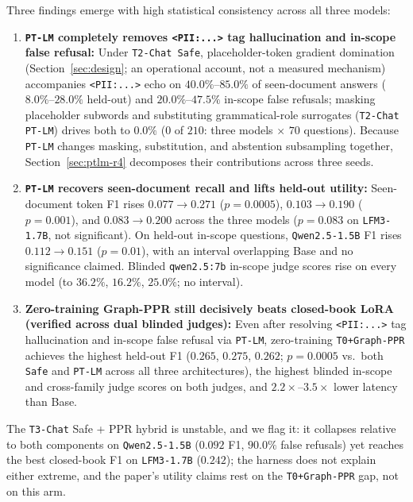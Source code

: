 \documentclass{article}
\begin{document}
Three findings emerge with high statistical consistency across all three models:
\begin{enumerate}
    \item \textbf{\texttt{PT-LM} completely removes \texttt{<PII:...>} tag hallucination and in-scope false refusal:} Under \texttt{T2-Chat Safe}, placeholder-token gradient domination (Section~\ref{sec:design}; an operational account, not a measured mechanism) accompanies \texttt{<PII:...>} echo on $40.0\%$--$85.0\%$ of seen-document answers ($8.0\%$--$28.0\%$ held-out) and $20.0\%$--$47.5\%$ in-scope false refusals; masking placeholder subwords and substituting grammatical-role surrogates (\texttt{T2-Chat PT-LM}) drives both to $\mathbf{0.0\%}$ ($0$ of $210$: three models $\times$ $70$ questions). Because \texttt{PT-LM} changes masking, substitution, and abstention subsampling together, Section~\ref{sec:ptlm-r4} decomposes their contributions across three seeds.
    \item \textbf{\texttt{PT-LM} recovers seen-document recall and lifts held-out utility:} Seen-document token F1 rises $0.077 \to \mathbf{0.271}$ ($p = 0.0005$), $0.103 \to \mathbf{0.190}$ ($p = 0.001$), and $0.083 \to \mathbf{0.200}$ across the three models ($p = 0.083$ on \texttt{LFM3-1.7B}, not significant). On held-out in-scope questions, \texttt{Qwen2.5-1.5B} F1 rises $0.112 \to 0.151$ ($p = 0.01$), with an interval overlapping Base and no significance claimed. Blinded \texttt{qwen2.5:7b} in-scope judge scores rise on every model (to $36.2\%$, $16.2\%$, $25.0\%$; no interval).
    \item \textbf{Zero-training Graph-PPR still decisively beats closed-book LoRA (verified across dual blinded judges):} Even after resolving \texttt{<PII:...>} tag hallucination and in-scope false refusal via \texttt{PT-LM}, zero-training \texttt{T0+Graph-PPR} achieves the highest held-out F1 ($0.265$, $0.275$, $0.262$; $p = 0.0005$ vs.\ both \texttt{Safe} and \texttt{PT-LM} across all three architectures), the highest blinded in-scope and cross-family judge scores on both judges, and $2.2\times$--$3.5\times$ lower latency than Base.
\end{enumerate}

The \texttt{T3-Chat} Safe + PPR hybrid is unstable, and we flag it: it collapses relative to both components on \texttt{Qwen2.5-1.5B} ($0.092$ F1, $90.0\%$ false refusals) yet reaches the best closed-book F1 on \texttt{LFM3-1.7B} ($0.242$); the harness does not explain either extreme, and the paper's utility claims rest on the \texttt{T0+Graph-PPR} gap, not on this arm.
\end{document}
